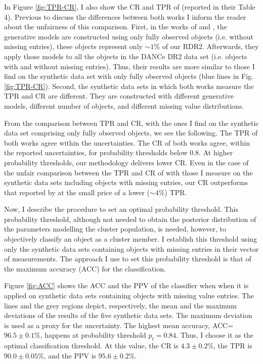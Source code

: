 In Figure \ref{fig:TPR-CR}, I also show the CR and TPR of \citet{Sarro2014} (reported in their Table 4). Previous to discuss the differences between both works I inform the reader about the unfairness of this comparison. First, in the works of \citet{Sarro2014} and \citet{Bouy2015}, the generative models are constructed using only fully observed objects (i.e. without missing entries), these objects represent only  $\sim 1\%$ of our RDR2. Afterwards, they apply those models to all the objects in the DANCe DR2 data set (i.e. objects with and without missing entries). Thus, their results are more similar to those I find on the synthetic data set with only fully observed objects (blue lines in Fig. \ref{fig:TPR-CR}). Second, the synthetic data sets in which both works measure the TPR and CR are different. They are constructed with different generative models, different number of objects, and different missing value distributions.

From the comparison between \citet{Sarro2014} TPR and CR, with the ones I find on the synthetic data set comprising only fully observed objects, we see the following. The TPR of both works agree within the uncertainties. The CR of both works agree, within the reported uncertainties, for probability thresholds below 0.8. At higher probability thresholds, our methodology delivers lower CR. Even in the case of the unfair comparison between the TPR and CR of \citet{Sarro2014} with those I measure on the synthetic data sets including objects with missing entries, our CR outperforms that reported by \citet{Sarro2014} at the small price of a lower ($\sim 4\%$) TPR.

Now, I describe the procedure to set an optimal probability threshold. This probability threshold, although not needed to obtain the posterior distribution of the parameters modelling the cluster population, is needed, however, to objectively classify an object as a cluster member. I establish this threshold using only the synthetic data sets containing objects with missing entries in their vector of measurements.  The approach I use to set this probability threshold is that of the maximum accuracy (ACC) for the classification. 

Figure \ref{fig:ACC} shows the ACC and the PPV of the classifier when when it is applied on synthetic data sets containing objects with missing value entries. The lines and the grey regions depict, respectively, the mean and the maximum deviations of the results of the five synthetic data sets. The maximum deviation is used as a proxy for the uncertainty. The highest mean accuracy, ACC=$96.5\pm0.1$\%, happens at probability threshold $p_t = 0.84$. Thus, I choose it as the optimal classification threshold. At this value, the CR is $4.3\pm0.2$\%, the TPR is $90.0\pm0.05$\%, and the PPV is $95.6\pm0.2$\%. 

